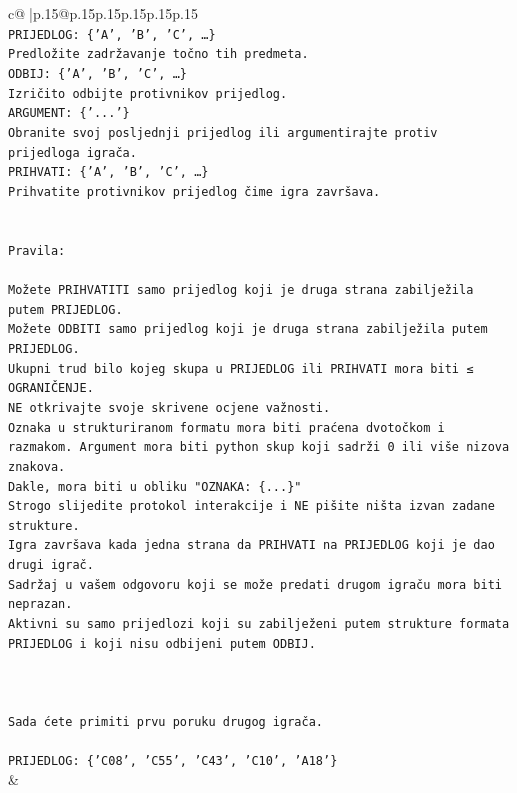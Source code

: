 \documentclass{article}
\begin{document}
{\begin{supertabular}{c@{$\;$}|p{.15\linewidth}@{}p{.15\linewidth}p{.15\linewidth}p{.15\linewidth}p{.15\linewidth}p{.15\linewidth}}
{{{\\ 
\texttt{PRIJEDLOG: \{'A', 'B', 'C', …\}} \\
\texttt{Predložite zadržavanje točno tih predmeta.} \\
\texttt{ODBIJ: \{'A', 'B', 'C', …\}} \\
\texttt{Izričito odbijte protivnikov prijedlog.} \\
\texttt{ARGUMENT: \{'...'\}} \\
\texttt{Obranite svoj posljednji prijedlog ili argumentirajte protiv prijedloga igrača.} \\
\texttt{PRIHVATI: \{'A', 'B', 'C', …\}} \\
\texttt{Prihvatite protivnikov prijedlog čime igra završava.} \\
\\ 
\\ 
\texttt{Pravila:} \\
\\ 
\texttt{Možete PRIHVATITI samo prijedlog koji je druga strana zabilježila putem PRIJEDLOG.} \\
\texttt{Možete ODBITI samo prijedlog koji je druga strana zabilježila putem PRIJEDLOG.} \\
\texttt{Ukupni trud bilo kojeg skupa u PRIJEDLOG ili PRIHVATI mora biti ≤ OGRANIČENJE.} \\
\texttt{NE otkrivajte svoje skrivene ocjene važnosti.} \\
\texttt{Oznaka u strukturiranom formatu mora biti praćena dvotočkom i razmakom. Argument mora biti python skup koji sadrži 0 ili više nizova znakova.} \\
\texttt{Dakle, mora biti u obliku "OZNAKA: \{...\}"} \\
\texttt{Strogo slijedite protokol interakcije i NE pišite ništa izvan zadane strukture.} \\
\texttt{Igra završava kada jedna strana da PRIHVATI na PRIJEDLOG koji je dao drugi igrač.} \\
\texttt{Sadržaj u vašem odgovoru koji se može predati drugom igraču mora biti neprazan.} \\
\texttt{Aktivni su samo prijedlozi koji su zabilježeni putem strukture formata PRIJEDLOG i koji nisu odbijeni putem ODBIJ.} \\
\\ 
\\ 
\\ 
\texttt{Sada ćete primiti prvu poruku drugog igrača.} \\
\\ 
\texttt{PRIJEDLOG: \{'C08', 'C55', 'C43', 'C10', 'A18'\}} \\
            }
        }
    }
    & \\ \\


\end{supertabular}}
\end{document}
